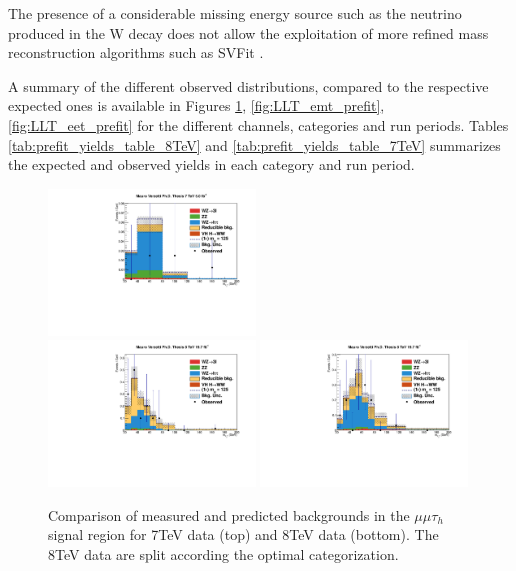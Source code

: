 The presence of a considerable missing energy source such as the neutrino produced in the W decay does not allow the exploitation of more refined mass reconstruction algorithms such as SVFit \cite{H_tautau}.

A summary of the different observed distributions, compared to the respective expected ones is available in Figures \ref{fig:LLT_mmt_prefit}, \ref{fig:LLT_emt_prefit}, \ref{fig:LLT_eet_prefit} for the different channels, categories and run periods. Tables \ref{tab:prefit_yields_table_8TeV} and \ref{tab:prefit_yields_table_7TeV} summarizes the expected and observed yields in each category and run period.

\begin{figure}
\begin{center}
  \includegraphics[width=0.49\textwidth]{4_Analisys/pics/7TeV/plots/mmt/LTCut/final-subMass-LTCut.pdf}\\
  \includegraphics[width=0.49\textwidth]{4_Analisys/pics/8TeV/plots/mmt/LTLow/final-subMass-LTLow.pdf}
  \includegraphics[width=0.49\textwidth]{4_Analisys/pics/8TeV/plots/mmt/LTHigh/final-subMass-LTHigh.pdf}\\
  \caption{Comparison of measured and predicted backgrounds in the $\mu\mu\tau_h$ signal region for 7TeV data (top) and 8TeV data (bottom). The 8TeV data are split according the optimal categorization.}
  \label{fig:LLT_mmt_prefit}
\end{center}
\end{figure}

